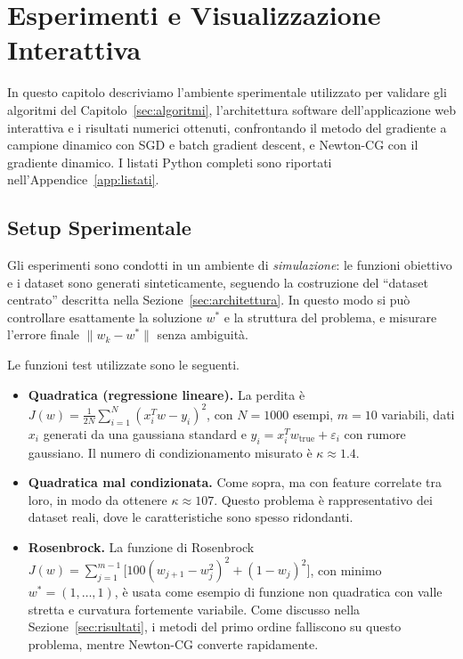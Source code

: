 \documentclass[a4paper,12pt]{article}
\numberwithin{equation}{section}
\numberwithin{figure}{section}
\numberwithin{table}{section}
\begin{document}
\section{Esperimenti e Visualizzazione Interattiva}\label{sec:esperimenti}

In questo capitolo descriviamo l'ambiente sperimentale utilizzato per
validare gli algoritmi del Capitolo~\ref{sec:algoritmi}, l'architettura
software dell'applicazione web interattiva e i risultati numerici ottenuti,
confrontando il metodo del gradiente a campione dinamico con SGD e batch
gradient descent, e Newton-CG con il gradiente dinamico. I listati Python
completi sono riportati nell'Appendice~\ref{app:listati}.

\subsection{Setup Sperimentale}\label{sec:setup}

Gli esperimenti sono condotti in un ambiente di \emph{simulazione}: le
funzioni obiettivo e i dataset sono generati sinteticamente, seguendo la
costruzione del ``dataset centrato'' descritta nella
Sezione~\ref{sec:architettura}. In questo modo si può controllare esattamente
la soluzione $w^*$ e la struttura del problema, e misurare l'errore finale
$\|w_k - w^*\|$ senza ambiguità.

Le funzioni test utilizzate sono le seguenti.

\begin{itemize}
  \item \textbf{Quadratica (regressione lineare).} La perdita è
  $J(w) = \frac{1}{2N}\sum_{i=1}^{N}(x_i^T w - y_i)^2$, con $N = 1000$ esempi,
  $m = 10$ variabili, dati $x_i$ generati da una gaussiana standard e
  $y_i = x_i^T w_{\mathrm{true}} + \varepsilon_i$ con rumore gaussiano.
  Il numero di condizionamento misurato è $\kappa \approx 1.4$.
  \item \textbf{Quadratica mal condizionata.} Come sopra, ma con feature
  correlate tra loro, in modo da ottenere $\kappa \approx 107$. Questo
  problema è rappresentativo dei dataset reali, dove le caratteristiche sono
  spesso ridondanti.
  \item \textbf{Rosenbrock.} La funzione di Rosenbrock
  $J(w) = \sum_{j=1}^{m-1}\bigl[100(w_{j+1}-w_j^2)^2 + (1-w_j)^2\bigr]$,
  con minimo $w^* = (1,\dots,1)$, è usata come esempio di funzione non
  quadratica con valle stretta e curvatura fortemente variabile. Come
  discusso nella Sezione~\ref{sec:risultati}, i metodi del primo ordine
  falliscono su questo problema, mentre Newton-CG converte rapidamente.
\end{itemize}
\end{document}
